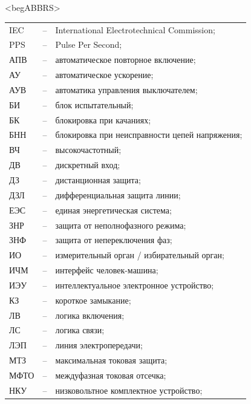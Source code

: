 \color{unimain}\section*{}
{\color{white}\fontsize{0.1pt}{0.1pt}\selectfont<begABBRS>}
\color{black}
\begin{longtable}{>{\raggedright\arraybackslash}m{2cm}>{\raggedright\arraybackslash}m{0.5cm}>{\raggedright\arraybackslash}m{20cm}}
\endfirsthead\endhead\endfoot\endlastfoot
IEC & -- &  International Electrotechnical Commission; \\
PPS & -- & Pulse Per Second; \\
АПВ & -- & автоматическое повторное включение; \\
АУ & -- & автоматическое ускорение; \\
АУВ & -- & автоматика управления выключателем; \\
БИ & -- & блок испытательный; \\
БК & -- & блокировка при качаниях; \\
БНН & -- & блокировка при неисправности цепей напряжения; \\
ВЧ & -- & высокочастотный; \\
ДВ & -- & дискретный вход; \\
ДЗ & -- & дистанционная защита; \\
ДЗЛ & -- & дифференциальная защита линии; \\
ЕЭС & -- & единая энергетическая система; \\
ЗНР & -- & защита от неполнофазного режима; \\
ЗНФ & -- & защита от непереключения фаз; \\
ИО & -- & измерительный орган / избирательный орган; \\
ИЧМ & -- & интерфейс человек-машина; \\
ИЭУ & -- & интеллектуальное электронное устройство; \\
КЗ & -- & короткое замыкание; \\
ЛВ & -- & логика включения; \\
ЛС & -- & логика связи; \\
ЛЭП & -- & линия электропередачи; \\
МТЗ & -- & максимальная токовая защита; \\
МФТО & -- & междуфазная токовая отсечка; \\
НКУ & -- & низковольтное комплектное устройство; \\

\end{longtable}
